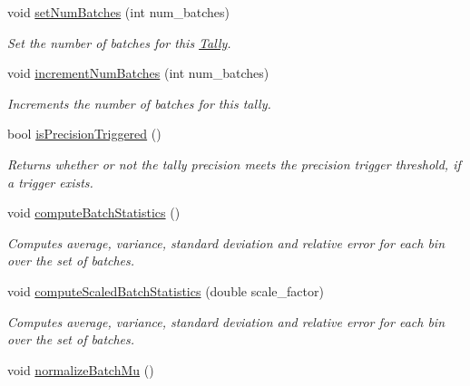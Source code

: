 \begin{DoxyCompactItemize}
$$void \hyperlink{classTally_aa9151ca7c865222b499032af22ab76c8}{set\-Num\-Batches} (int num\-\_\-batches)
\begin{DoxyCompactList}\small\item\em Set the number of batches for this \hyperlink{classTally}{Tally}. \end{DoxyCompactList}\item 
void \hyperlink{classTally_a0c2ee4c8fd57b8b51df52a0abe62ec06}{increment\-Num\-Batches} (int num\-\_\-batches)
\begin{DoxyCompactList}\small\item\em Increments the number of batches for this tally. \end{DoxyCompactList}\item 
bool \hyperlink{classTally_acc38798b21b99da9b1c04bfa4d067547}{is\-Precision\-Triggered} ()
\begin{DoxyCompactList}\small\item\em Returns whether or not the tally precision meets the precision trigger threshold, if a trigger exists. \end{DoxyCompactList}\item 
void \hyperlink{classTally_a2c6ba9c07af18d5b2fda8840791dab14}{compute\-Batch\-Statistics} ()
\begin{DoxyCompactList}\small\item\em Computes average, variance, standard deviation and relative error for each bin over the set of batches. \end{DoxyCompactList}\item 
void \hyperlink{classTally_a7b34a782b04b7056fe7d3ea4b70828e7}{compute\-Scaled\-Batch\-Statistics} (double scale\-\_\-factor)
\begin{DoxyCompactList}\small\item\em Computes average, variance, standard deviation and relative error for each bin over the set of batches. \end{DoxyCompactList}\item 
\hypertarget{classTally_a79fc34d3cb879defffcc9cce4254c36b}{void \hyperlink{classTally_a79fc34d3cb879defffcc9cce4254c36b}{normalize\-Batch\-Mu} ()}\label{classTally_a79fc34d3cb879defffcc9cce4254c36b}


\end{DoxyCompactItemize}
